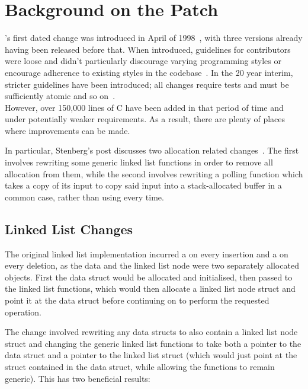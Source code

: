 
\section{Background on the Patch}

's first dated change was introduced in April of 1998~\cite{curlrelease}, with three versions already having been released before that. When introduced, guidelines for contributors were loose and didn't particularly discourage varying programming styles or encourage adherence to existing styles in the codebase~\cite{curlcontribute1999}. In the 20 year interim, stricter guidelines have been introduced; all changes require tests and must be sufficiently atomic and so on~\cite{curlcontribute2017}.\\
However, over 150,000 lines of C have been added in that period of time and under potentially weaker requirements. As a result, there are plenty of places where improvements can be made.

In particular, Stenberg's post discusses two allocation related changes~\cite{curlmalloc}. The first involves rewriting some generic linked list functions in order to remove all allocation from them, while the second involves rewriting a polling function which takes a copy of its input to copy said input into a stack-allocated buffer in a common case, rather than using \malloc{} every time.

\subsection{Linked List Changes}

The original linked list implementation incurred a \malloc{} on every insertion and a \free{} on every deletion, as the data and the linked list node were two separately allocated objects. First the data struct would be allocated and initialised, then passed to the linked list functions, which would then allocate a linked list node struct and point it at the data struct before continuing on to perform the requested operation.

The change involved rewriting any data structs to also contain a linked list node struct and changing the generic linked list functions to take both a pointer to the data struct and a pointer to the linked list struct (which would just point at the struct contained in the data struct, while allowing the functions to remain generic). This has two beneficial results:

